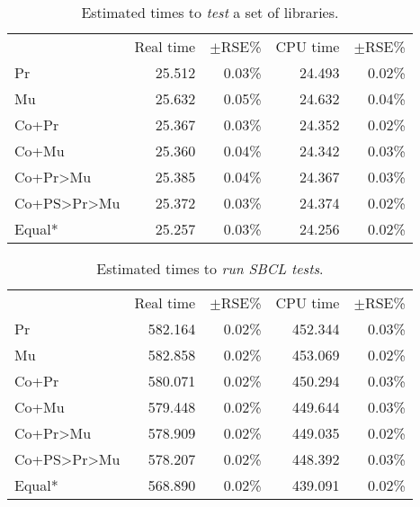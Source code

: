 \documentclass[sigconf]{acmart}
\renewcommand{\label}[1]{%
    \gdef\sfname{sf:##1}}%
\begin{document}
\begin{table}
  \caption{Estimated times to \emph{test} a set of libraries.}
  \label{tab:test-system-results}
  \centering
  \begin{tabular}{@{}lrrrr@{}}
                   & Real time   & $\pm$RSE\% & CPU time & $\pm$RSE\% \\
Pr                 & 25.512  &     0.03\% &  24.493 &     0.02\% \\
Mu                 & 25.632  &     0.05\% &  24.632 &     0.04\% \\
Co+Pr              & 25.367  &     0.03\% &  24.352 &     0.02\% \\
Co+Mu              & 25.360  &     0.04\% &  24.342 &     0.03\% \\
Co+Pr>Mu           & 25.385  &     0.04\% &  24.367 &     0.03\% \\
Co+PS>Pr>Mu        & 25.372  &     0.03\% &  24.374 &     0.02\% \\
Equal*             & 25.257  &     0.03\% &  24.256 &     0.02\%
  \end{tabular}
\end{table}

\begin{table}
  \caption{Estimated times to \emph{run SBCL tests}.}
  \label{tab:sbcl-tests-results}
  \centering
  \begin{tabular}{@{}lrrrr@{}}
                   & Real time & $\pm$RSE\% & CPU time & $\pm$RSE\% \\
Pr                 & 582.164 &  0.02\% & 452.344 &  0.03\% \\
Mu                 & 582.858 &  0.02\% & 453.069 &  0.02\% \\
Co+Pr              & 580.071 &  0.02\% & 450.294 &  0.03\% \\
Co+Mu              & 579.448 &  0.02\% & 449.644 &  0.03\% \\
Co+Pr>Mu           & 578.909 &  0.02\% & 449.035 &  0.02\% \\
Co+PS>Pr>Mu        & 578.207 &  0.02\% & 448.392 &  0.03\% \\
Equal*             & 568.890 &  0.02\% & 439.091 &  0.02\%
  \end{tabular}
\end{table}
\end{document}
